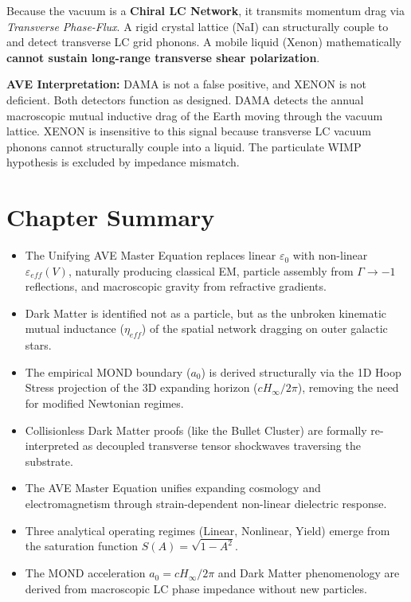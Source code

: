 Because the vacuum is a \textbf{Chiral LC Network}, it transmits momentum drag via \textit{Transverse Phase-Flux}. A rigid crystal lattice (NaI) can structurally couple to and detect transverse LC grid phonons. A mobile liquid (Xenon) mathematically \textbf{cannot sustain long-range transverse shear polarization}. 

\textbf{AVE Interpretation:} DAMA is not a false positive, and XENON is not deficient. Both detectors function as designed. DAMA detects the annual macroscopic mutual inductive drag of the Earth moving through the vacuum lattice. XENON is insensitive to this signal because transverse LC vacuum phonons cannot structurally couple into a liquid. The particulate WIMP hypothesis is excluded by impedance mismatch.

\section*{Chapter Summary}
\begin{itemize}
    \item The Unifying AVE Master Equation replaces linear $\varepsilon_0$ with non-linear $\varepsilon_{eff}(V)$, naturally producing classical EM, particle assembly from $\Gamma \to -1$\gammaundeclared{} reflections, and macroscopic gravity from refractive gradients.
    \item Dark Matter is identified not as a particle, but as the unbroken kinematic mutual inductance ($\eta_{eff}$) of the spatial network dragging on outer galactic stars.
    \item The empirical MOND boundary ($a_0$) is derived structurally via the 1D Hoop Stress projection of the 3D expanding horizon ($c H_\infty / 2\pi$), removing the need for modified Newtonian regimes.
    \item Collisionless Dark Matter proofs (like the Bullet Cluster) are formally re-interpreted as decoupled transverse tensor shockwaves traversing the substrate.
\end{itemize}

\begin{summarybox}
\begin{itemize}
    \item The AVE Master Equation unifies expanding cosmology and electromagnetism through strain-dependent non-linear dielectric response.
    \item Three analytical operating regimes (Linear, Nonlinear, Yield) emerge from the saturation function $S(A) = \sqrt{1-A^2}$.
    \item The MOND acceleration $a_0 = cH_\infty / 2\pi$ and Dark Matter phenomenology are derived from macroscopic LC phase impedance without new particles.
\end{itemize}
\end{summarybox}

